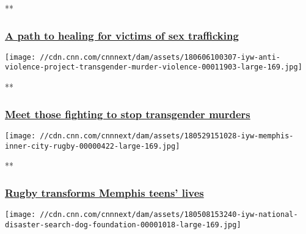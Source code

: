 **

\hypertarget{a-path-to-healing-for-victims-of-sex-trafficking-}{%
\subsubsection{\texorpdfstring{\href{/videos/tv/2019/02/19/iyw-wellspring-video.cnn/video/playlists/impact-your-world/}{A
path to healing for victims of sex trafficking
}}{A path to healing for victims of sex trafficking }}\label{a-path-to-healing-for-victims-of-sex-trafficking-}}

\href{/videos/tv/2018/06/06/iyw-anti-violence-project-transgender-murder-violence.cnn/video/playlists/impact-your-world/}{}

\texttt{[image: //cdn.cnn.com/cnnnext/dam/assets/180606100307-iyw-anti-violence-project-transgender-murder-violence-00011903-large-169.jpg]}

**

\hypertarget{meet-those-fighting-to-stop-transgender-murders}{%
\subsubsection{\texorpdfstring{\href{/videos/tv/2018/06/06/iyw-anti-violence-project-transgender-murder-violence.cnn/video/playlists/impact-your-world/}{Meet
those fighting to stop transgender
murders}}{Meet those fighting to stop transgender murders}}\label{meet-those-fighting-to-stop-transgender-murders}}

\href{/videos/us/2018/05/29/iyw-memphis-inner-city-rugby.cnn/video/playlists/impact-your-world/}{}

\texttt{[image: //cdn.cnn.com/cnnnext/dam/assets/180529151028-iyw-memphis-inner-city-rugby-00000422-large-169.jpg]}

**

\hypertarget{rugby-transforms-memphis-teens-lives}{%
\subsubsection{\texorpdfstring{\href{/videos/us/2018/05/29/iyw-memphis-inner-city-rugby.cnn/video/playlists/impact-your-world/}{Rugby
transforms Memphis teens'
lives}}{Rugby transforms Memphis teens' lives}}\label{rugby-transforms-memphis-teens-lives}}

\href{/videos/tv/2018/05/08/iyw-national-disaster-search-dog-foundation.cnn/video/playlists/impact-your-world/}{}

\texttt{[image: //cdn.cnn.com/cnnnext/dam/assets/180508153240-iyw-national-disaster-search-dog-foundation-00001018-large-169.jpg]}

